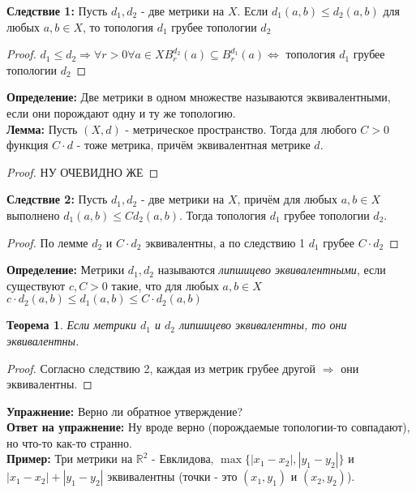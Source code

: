 \documentclass[a4paper,100pt]{article}
\theoremstyle{indented}
\newtheorem{theorem}{Теорема}
\begin{document}
\textbf{Следствие 1:} Пусть $d_1, d_2$ - две метрики на $X$. Если $d_1(a, b) \leq d_2(a, b)$ для любых $a, b \in X$, то топология $d_1$ грубее топологии $d_2$

\begin{proof} $d_1 \leq d_2 \Rightarrow \forall r > 0 \forall a \in X B_r^{d_2}(a) \subseteq B_r^{d_1}(a) \Longleftrightarrow$ топология $d_1$ грубее топологии $d_2$
\end{proof}

\textbf{Определение:} Две метрики в одном множестве называются \hypertarget{n13}{эквивалентными}, если они порождают одну и ту же топологию.
\\

\textbf{Лемма: } Пусть $(X, d)$ - метрическое пространство. Тогда для любого $C>0$ функция $C \cdot d$ - тоже метрика, причём эквивалентная метрике $d$.

\begin{proof} НУ ОЧЕВИДНО ЖЕ
\end{proof}

\textbf{Следствие 2:} Пусть $d_1, d_2$ - две метрики на $X$, причём для любых $a, b \in X$ выполнено $d_1(a, b) \leq Cd_2(a, b)$. Тогда топология $d_1$ грубее топологии $d_2$.

\begin{proof} По лемме $d_2$ и $C \cdot d_2$ эквивалентны, а по следствию 1 $d_1$ грубее $C \cdot d_2$
\end{proof}

\textbf{Определение: } Метрики $d_1, d_2$ \hypertarget{n14}{называются} \textit{липшицево эквивалентными}, если существуют $c, C > 0$ такие, что для любых $a, b \in X$ $c \cdot d_2(a, b) \leq d_1(a, b) \leq C \cdot d_2(a, b)$
\\
\begin{theorem}
Если метрики $d_1$ и $d_2$ липшицево эквивалентны, то они эквивалентны.
\end{theorem}

\begin{proof} Согласно следствию 2, каждая из метрик грубее другой $\Rightarrow$ они эквивалентны.
\end{proof}
 
\textbf{Упражнение:} Верно ли обратное утверждение?
\\

\textbf{Ответ на упражнение: } Ну вроде верно (порождаемые топологии-то совпадают), но что-то как-то странно.
\\

\textbf{Пример: } Три метрики на $\mathbb{R}^2$ - Евклидова, $\max\{|x_1-x_2|, |y_1-y_2|\}$ и $|x_1-x_2|+|y_1-y_2|$ эквивалентны (точки - это $(x_1, y_1)$ и $(x_2, y_2)$).
\end{document}

